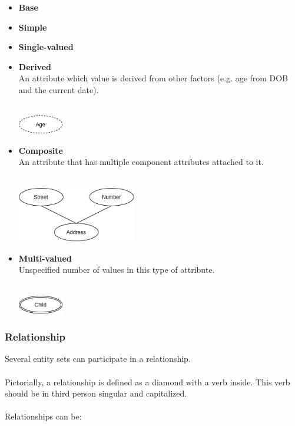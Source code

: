 \documentclass{article}
\begin{document}
\begin{itemize}
	\item \textbf{Base}
	
	\item \textbf{Simple}
	
	\item \textbf{Single-valued}
	
	\item \textbf{Derived}
	\vspace{.2cm} \\
	An attribute which value is derived from other factors (e.g. age from DOB and the current date). \\ \\
	
	\centerline{\includegraphics[width=2cm]{./assets/derived.png}}
	
	\item \textbf{Composite}
	\vspace{.2cm} \\
	An attribute that has multiple component attributes attached to it. \\ \\
	
	\centerline{\includegraphics[width=5.2cm]{./assets/composite.png}}
	
	\item \textbf{Multi-valued}
	\vspace{.2cm} \\
	Unspecified number of values in this type of attribute. \\ \\
	
	\centerline{\includegraphics[width=2cm]{./assets/multivalued.png}}
\end{itemize}
	
\subsubsection{Relationship}
Several entity sets can participate in a relationship.\\ \\
Pictorially, a relationship is defined as a diamond with a verb inside. This verb should be in third person singular and capitalized. \\ \\
Relationships can be:
\end{document}
